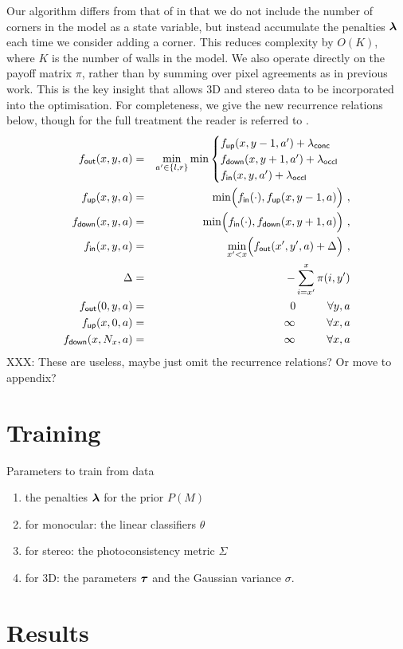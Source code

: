\documentclass{article}
\newcommand\ColPayoff{\pi}
\newcommand\Penalties{\vect{\lambda}}
\newcommand\PenaltyOccl{\lambda_\textsf{occl}}
\newcommand\PenaltyConc{\lambda_\textsf{conc}}
\newcommand\fIN{f_{\textsf{in}}}
\newcommand\fOUT{f_{\textsf{out}}}
\newcommand\fUP{f_{\textsf{up}}}
\newcommand\fDOWN{f_{\textsf{down}}}
\begin{document}
Our algorithm differs from that of \cite{FlintECCV10} in that we do
not include the number of corners in the model as a state variable,
but instead accumulate the penalties $\Penalties$ each time we
consider adding a corner. This reduces complexity by $O(K)$, where $K$
is the number of walls in the model. We also operate directly on the
payoff matrix $\ColPayoff$, rather than by summing over pixel
agreements as in previous work. This is the key insight that allows 3D
and stereo data to be incorporated into the optimisation. For
completeness, we give the new recurrence relations below, though for
the full treatment the reader is referred to \cite{FlintECCV10}.
\begin{eqnarray}
  \label{eq:fout-recurrence}
    \fOUT(x,y,a) &=& \min_{a'\in\{l,r\}} \min
      \begin{cases}
        \fUP(x,y-1,a') + \PenaltyConc & \\
        \fDOWN(x,y+1,a') + \PenaltyOccl & \\
        \fIN(x,y,a') + \PenaltyOccl &
      \end{cases}\\
  \label{eq:fup-recurrence}
  \fUP(x,y,a) &=& \min \Bigl(\fIN(\cdot), \fUP(x,y-1,a)\Bigr)~,\\
  \label{eq:fdown-recurrence}
  \fDOWN(x,y,a) &=& \min \Bigl(\fIN(\cdot), \fDOWN(x,y+1,a)\Bigr)~,\\
  \label{eq:fin-recurrence-basic}
  \fIN(x,y,a) &=&
    \min_{x'<x}\Bigl(\fOUT(x',y',a)+ \Delta\Bigr) ~,\\
  \Delta &=& - \sum_{i=x'}^{x} \ColPayoff(i,y')\\
  \fOUT(0,y,a) &=& 0 \hspace{1cm} \forall y,a \\
  \fUP(x,0,a) &=& \infty \hspace{1cm} \forall x,a \\
  \fDOWN(x,N_x,a) &=& \infty \hspace{1cm} \forall x,a
\end{eqnarray}
XXX: These are useless, maybe just omit the recurrence relations? Or
move to appendix?

\section{Training}

Parameters to train from data
\begin{enumerate}
  \item{the penalties $\boldsymbol{\lambda}$ for the prior $P(M)$}
  \item{for monocular: the linear classifiers $\theta$}
  \item{for stereo: the photoconsistency metric $\Sigma$}
  \item{for 3D: the parameters $\boldsymbol{\tau}$ and the Gaussian
    variance $\sigma$.}
\end{enumerate}

\section{Results}




\end{document}
